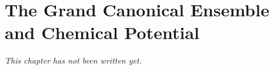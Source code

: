 \chapter{The Grand Canonical Ensemble and Chemical Potential}\label{ch:b3:grand-canonical}


\emph{This chapter has not been written yet.}
